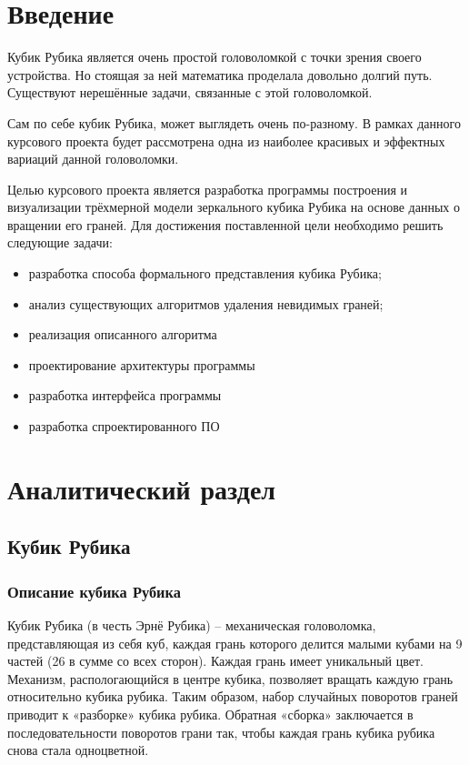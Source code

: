 \documentclass[a4paper, 14pt]{report} %
\begin{document}
	\tableofcontents %
	\chapter{Введение}
	Кубик Рубика является очень простой головоломкой с точки зрения своего устройства. Но стоящая за ней математика проделала довольно долгий путь. Существуют нерешённые задачи, связанные с этой головоломкой.
	
	Сам по себе кубик Рубика, может выглядеть очень по-разному. В рамках данного курсового проекта будет рассмотрена одна из наиболее красивых и эффектных вариаций данной головоломки. 
	
	Целью курсового проекта является разработка программы построения и визуализации трёхмерной модели зеркального кубика Рубика на основе данных о вращении его граней. Для достижения поставленной цели необходимо решить следующие задачи:
	\begin{itemize}
		\item разработка способа формального представления кубика Рубика;
		\item анализ существующих алгоритмов удаления невидимых граней;
		\item реализация описанного алгоритма
		\item проектирование архитектуры программы
		\item разработка интерфейса программы
		\item разработка спроектированного ПО
	\end{itemize}

	\chapter{Аналитический раздел}
	\section{Кубик Рубика}
	\subsection{Описание кубика Рубика}
	Кубик Рубика (в честь Эрнё Рубика) – механическая головоломка, представляющая из себя куб, каждая грань которого делится малыми кубами на 9 частей (26 в сумме со всех сторон). Каждая грань имеет уникальный цвет. Механизм, распологающийся в центре кубика, позволяет вращать каждую грань относительно кубика рубика. Таким образом, набор случайных поворотов граней приводит к «разборке» кубика рубика. Обратная «сборка» заключается в последовательности поворотов грани так, чтобы каждая грань кубика рубика снова стала одноцветной.
	
\end{document}

